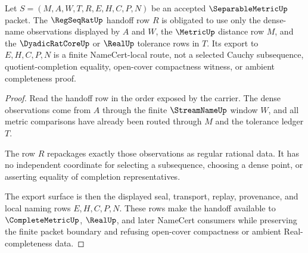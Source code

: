 \begin{theorem}
\label{thm:separablemetric-regular-handoff-obligation}
Let $S=(M,A,W,T,R,E,H,C,P,N)$ be an accepted $\SeparableMetricUp$ packet. The $\RegSeqRatUp$ handoff row $R$ is obligated to use only the dense-name observations displayed by $A$ and $W$, the $\MetricUp$ distance row $M$, and the $\DyadicRatCoreUp$ or $\RealUp$ tolerance rows in $T$. Its export to $E,H,C,P,N$ is a finite NameCert-local route, not a selected Cauchy subsequence, quotient-completion equality, open-cover compactness witness, or ambient completeness proof.
\end{theorem}
\begin{proof}
Read the handoff row in the order exposed by the carrier. The dense observations come from $A$ through the finite $\StreamNameUp$ window $W$, and all metric comparisons have already been routed through $M$ and the tolerance ledger $T$.

The row $R$ repackages exactly those observations as regular rational data. It has no independent coordinate for selecting a subsequence, choosing a dense point, or asserting equality of completion representatives.

The export surface is then the displayed seal, transport, replay, provenance, and local naming rows $E,H,C,P,N$. These rows make the handoff available to $\CompleteMetricUp$, $\RealUp$, and later NameCert consumers while preserving the finite packet boundary and refusing open-cover compactness or ambient Real-completeness data.
\end{proof}

